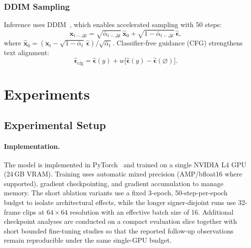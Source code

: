 \documentclass{ieeeaccess}
\begin{document}
\subsubsection{DDIM Sampling}

Inference uses DDIM~\cite{song2020denoising}, which enables accelerated sampling with 50 steps:
\begin{equation}
    \mathbf{x}_{t-\Delta t} = \sqrt{\bar{\alpha}_{t-\Delta t}} \, \hat{\mathbf{x}}_0 + \sqrt{1-\bar{\alpha}_{t-\Delta t}} \, \hat{\boldsymbol{\epsilon}},
\end{equation}
where $\hat{\mathbf{x}}_0 = (\mathbf{x}_t - \sqrt{1-\bar{\alpha}_t}\,\hat{\boldsymbol{\epsilon}})/\sqrt{\bar{\alpha}_t}$. Classifier-free guidance (CFG) strengthens text alignment:
\begin{equation}
    \hat{\boldsymbol{\epsilon}}_\mathrm{cfg} = \hat{\boldsymbol{\epsilon}}(y) + w \bigl[\hat{\boldsymbol{\epsilon}}(y) - \hat{\boldsymbol{\epsilon}}(\varnothing)\bigr].
\end{equation}

\section{Experiments}
\label{sec:experiments}

\subsection{Experimental Setup}

\paragraph{Implementation.} The model is implemented in PyTorch~\cite{paszke2019pytorch} and trained on a single NVIDIA L4 GPU (24\,GB VRAM). Training uses automatic mixed precision (AMP/bfloat16 where supported), gradient checkpointing, and gradient accumulation to manage memory. The short ablation variants use a fixed 3-epoch, 50-step-per-epoch budget to isolate architectural effects, while the longer signer-disjoint runs use 32-frame clips at $64\times64$ resolution with an effective batch size of 16. Additional checkpoint analyses are conducted on a compact evaluation slice together with short bounded fine-tuning studies so that the reported follow-up observations remain reproducible under the same single-GPU budget.
\end{document}

